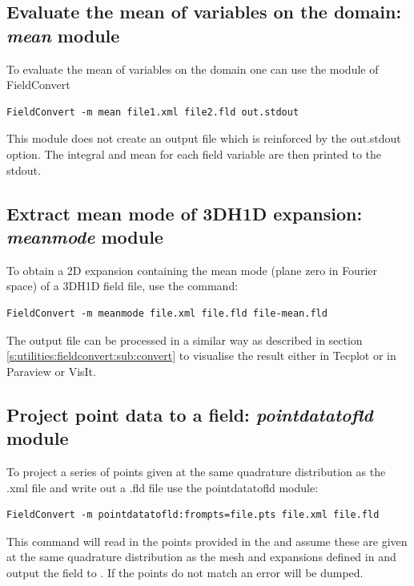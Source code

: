 %
%
%
\subsection{Evaluate the mean of variables on the domain: \textit{mean} module}
To evaluate the mean of variables on the domain one can use the
 module of FieldConvert
%
\begin{lstlisting}[style=BashInputStyle]
FieldConvert -m mean file1.xml file2.fld out.stdout
\end{lstlisting}
%
This module does not create an output file which is reinforced by the
out.stdout option. The integral and mean for each field variable are
then printed to the stdout.
%
%
%
\subsection{Extract mean mode of 3DH1D expansion: \textit{meanmode} module}

To obtain a 2D expansion containing the mean mode (plane zero in Fourier space) of a
3DH1D field file, use the command:
\begin{lstlisting}[style=BashInputStyle]
FieldConvert -m meanmode file.xml file.fld file-mean.fld
\end{lstlisting}

The output file  can be processed in a similar
way as described in section \ref{s:utilities:fieldconvert:sub:convert}
to visualise the result either in Tecplot or in Paraview or VisIt.
%
%
%

\subsection{ Project point data to a field: \textit{pointdatatofld} module}
\label{s:utilities:fieldconvert:sub:pointdatatofld}
To project a series of points given at the same quadrature distribution as the .xml file and write out a .fld file use the pointdatatofld module:
%
\begin{lstlisting}[style=BashInputStyle]
FieldConvert -m pointdatatofld:frompts=file.pts file.xml file.fld
\end{lstlisting}
%
This command will read in the points provided in the 
and assume these are given at the same quadrature distribution as the
mesh and expansions defined in  and output the field
to . If the points do not match an error will be dumped.


